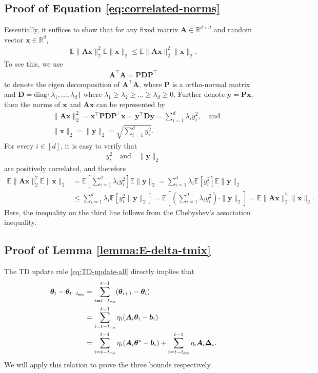 \subsection{Proof of Equation \eqref{eq:correlated-norms}}\label{app:proof-correlated-norms}
Essentially, it suffices to show that for any fixed matrix $\bm{A} \in \mathbb{R}^{d \times d}$ and random vector $\bm{x} \in \mathbb{R}^d$,
\begin{align}
\mathbb{E}\|\bm{Ax}\|_2^2 \mathbb{E}\|\bm{x}\|_2 \leq \mathbb{E}\|\bm{Ax}\|_2^2\|\bm{x}\|_2.
\end{align}
To see this, we use
\begin{align*}
\bm{A}^\top \bm{A} = \bm{PDP}^\top
\end{align*}
to denote the eigen decomposition of $\bm{A}^\top\bm{A}$, where $\bm{P}$ is a ortho-normal matrix and $\bm{D} = \text{diag}\{\lambda_1,...,\lambda_d\}$ where $\lambda_1 \geq \lambda_2 \geq ... \geq \lambda_d \geq 0$. Further denote $\bm{y} = \bm{Px}$, then the norms of $\bm{x}$ and $\bm{Ax}$ can be represented by
\begin{align*}
&\|\bm{Ax}\|_2^2 = \bm{x}^\top \bm{PDP}^\top \bm{x} = \bm{y}^\top \bm{Dy} = \sum_{i=1}^d \lambda_i y_i^2, \quad \text{and} \\ 
&\|\bm{x}\|_2 = \|\bm{y}\|_2 = \sqrt{\sum_{i=1}^d y_i^2}.
\end{align*}
For every $i \in [d]$, it is easy to verify that
\begin{align*}
y_i^2 \quad \text{and} \quad \|\bm{y}\|_2
\end{align*}
are positively correlated, and therefore
\begin{align*}
\mathbb{E}\|\bm{Ax}\|_2^2 \mathbb{E}\|\bm{x}\|_2 &= \mathbb{E}\left[\sum_{i=1}^d \lambda_i y_i^2\right]\mathbb{E}\|\bm{y}\|_2 = \sum_{i=1}^d \lambda_i \mathbb{E}[y_i^2] \mathbb{E}\|\bm{y}\|_2 \\ 
&\leq \sum_{i=1}^d \lambda_i \mathbb{E}[y_i^2 \|\bm{y}\|_2] = \mathbb{E}\left[\left(\sum_{i=1}^d \lambda_i y_i^2\right) \cdot \|\bm{y}\|_2 \right] = \mathbb{E}\|\bm{Ax}\|_2^2\|\bm{x}\|_2.
\end{align*}
Here, the inequality on the third line follows from the Chebyshev's association inequality.

\subsection{Proof of Lemma \ref{lemma:E-delta-tmix}}\label{app:proof-lemma-E-delta-tmix}
The TD update rule \eqref{eq:TD-update-all} directly implies that
\begin{align}\label{eq:theta-tmix-decompose}
\bm{\theta}_t - \bm{\theta}_{t-t_{\mathsf{mix}}}&= \sum_{i=t-t_{\mathsf{mix}}}^{t-1} (\bm{\theta}_{i+1} - \bm{\theta}_i) \nonumber \\ 
&= \sum_{i=t-t_{\mathsf{mix}}}^{t-1} \eta_i (\bm{A}_i\bm{\theta}_i-\bm{b}_i)\nonumber \\ 
&= \sum_{i=t-t_{\mathsf{mix}}}^{t-1} \eta_i (\bm{A}_i\bm{\theta}^\star-\bm{b}_i) + \sum_{i=t-t_{\mathsf{mix}}}^{t-1} \eta_i \bm{A}_i \bm{\Delta}_i.
\end{align}
We will apply this relation to prove the three bounds respectively.
